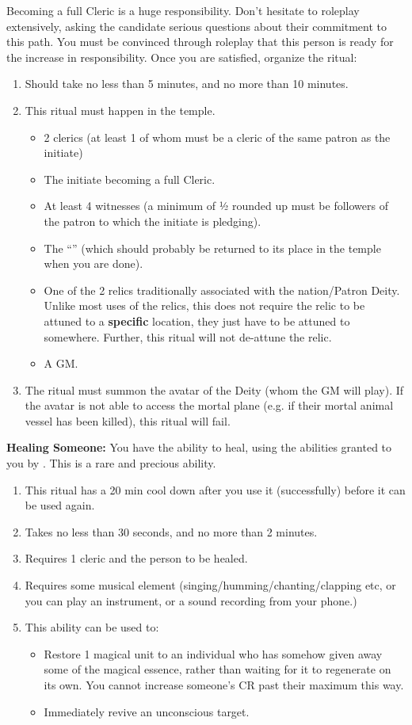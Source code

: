 \documentclass[green]{GL2020}
\begin{document}
Becoming a full Cleric is a huge responsibility. Don’t hesitate to roleplay extensively, asking the candidate serious questions about their commitment to this path. You must be convinced through roleplay that this person is ready for the increase in responsibility. Once you are satisfied, organize the ritual:
  \begin{enumerate}
    \item Should take no less than 5 minutes, and no more than 10 minutes.
    \item This ritual must happen in the temple.
    \begin{itemize}
      \item 2 clerics (at least 1 of whom must be a cleric of the same patron as the initiate)
      \item The initiate becoming a full Cleric.
      \item At least 4 witnesses (a minimum of ½ rounded up must be followers of the patron to which the initiate is pledging).
      \item The ``\iOakStaff{}'' (which should probably be returned to its place in the temple when you are done).
      \item One of the 2 relics traditionally associated with the nation/Patron Deity. Unlike most uses of the relics, this does not require the relic to be attuned to a \textbf{specific} location, they just have to be attuned to somewhere. Further, this ritual will not de-attune the relic.
      \item A GM.
    \end{itemize}
    \item The ritual must summon the avatar of the Deity (whom the GM will play). If the avatar is not able to access the mortal plane (e.g. if their mortal animal vessel has been killed), this ritual will fail. 
  \end{enumerate}
   
\textbf{Healing Someone:}
You have the ability to heal, using the abilities granted to you by \cFarmGod{}. This is a rare and precious ability.
  \begin{enumerate}
    \item This ritual has a 20 min cool down after you use it (successfully) before it can be used again.
    \item Takes no less than 30 seconds, and no more than 2 minutes.
    \item Requires 1 cleric and the person to be healed.
    \item Requires some musical element (singing/humming/chanting/clapping etc, or you can play an instrument, or a sound recording from your phone.)
    \item This ability can be used to: 
    \begin{itemize}
      \item Restore 1 magical unit to an individual who has somehow given away some of the magical essence, rather than waiting for it to regenerate on its own. You cannot increase someone’s CR past their maximum this way.
      \item Immediately revive an unconscious target.
    \end{itemize}
  \end{enumerate}
\end{document}
